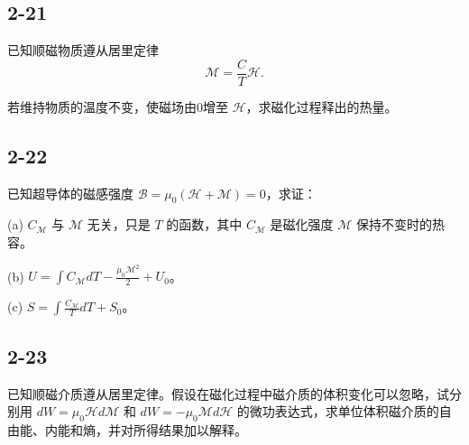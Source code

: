 \newpage
\subsection{2-21}
已知顺磁物质遵从居里定律
$$\mathcal{M} = \frac{C}{T} \mathcal{H} .$$

若维持物质的温度不变，使磁场由0增至 $\mathcal{H}$，求磁化过程释出的热量。

\newpage
\subsection{2-22}
已知超导体的磁感强度 $\mathcal{B} = \mu_0 (\mathcal{H} + \mathcal{M}) = 0$，求证：

(a) $C_{\mathcal{M}}$ 与 $\mathcal{M}$ 无关，只是 $T$ 的函数，其中 $C_{\mathcal{M}}$ 是磁化强度 $\mathcal{M}$ 保持不变时的热容。

(b) $U = \int C_{\mathcal{M}} dT - \frac{\mu_0 \mathcal{M}^2}{2} + U_0$。

(c) $S = \int \frac{C_{\mathcal{M}}}{T} dT + S_0$。

\newpage
\subsection{2-23}
已知顺磁介质遵从居里定律。假设在磁化过程中磁介质的体积变化可以忽略，试分别用 $dW = \mu_0 \mathcal{H} d\mathcal{M}$ 和 $dW = -\mu_0 \mathcal{M} d\mathcal{H}$ 的微功表达式，求单位体积磁介质的自由能、内能和熵，并对所得结果加以解释。